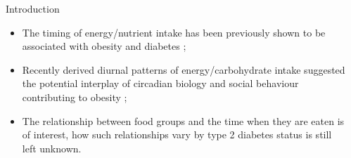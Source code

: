 \documentclass[final, 16pt]{beamer}
\newlength{\sepwidth}
\newlength{\colwidth}
\newcommand{\separatorcolumn}{\begin{column}{\sepwidth}\end{column}}
\begin{document}
\begin{frame}[t]
\begin{columns}[t]
\separatorcolumn

\begin{column}{\colwidth}

  \begin{block}{Introduction}

    \begin{itemize}
	\item The timing of energy/nutrient intake has been previously shown to be associated with obesity and diabetes \cite{Almoosawi2019Chrono};
	\item Recently derived diurnal patterns of energy/carbohydrate intake suggested the potential interplay of circadian biology and social behaviour contributing to obesity \cite{Palla2019};
  \item The relationship between food groups and the time when they are eaten is of interest, how such relationships vary by type 2 diabetes status is still left unknown.
\end{itemize}




%	


\end{block}
\end{column}
\end{columns}
\end{frame}
\end{document}
